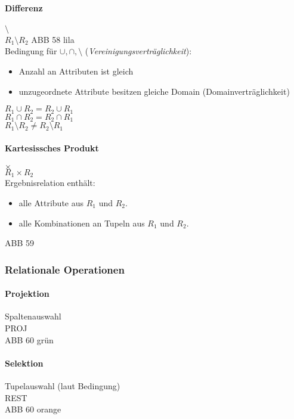 \paragraph{Differenz} $\setminus$\\
$R_1\setminus R_2$
ABB 58 lila\\
Bedingung für $\cup, \cap, \setminus$ (\emph{Vereinigungsverträglichkeit}):
\begin{itemize}
\item Anzahl an Attributen ist gleich
\item unzugeordnete Attribute besitzen gleiche Domain (Domainverträglichkeit)
\end{itemize}
$R_1\cup R_2 = R_2 \cup R_1$\\
$R_1 \cap R_2 = R_2 \cap R_1$\\
$R_1 \setminus R_2 \not = R_2 \setminus R_1$
\paragraph{Kartesissches Produkt} $\times$\\
$R_1\times R_2$\\
Ergebnisrelation enthält: 
\begin{itemize}
\item alle Attribute aus $R_1$ und $R_2$.
\item alle Kombinationen an Tupeln aus $R_1$ und $R_2$.
\end{itemize}
ABB 59
\subsubsection{Relationale Operationen}
\paragraph{Projektion} Spaltenauswahl\\
PROJ\\
ABB 60 grün
\paragraph{Selektion} Tupelauswahl (laut Bedingung)\\
REST\\
ABB 60 orange
